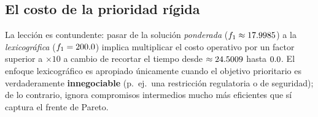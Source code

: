 \subsection{El costo de la prioridad rígida}

La lección es contundente: pasar de la solución \emph{ponderada}
($f_1 \approx \num{17.9985}$) a la \emph{lexicográfica}
($f_1 = \num{200.0}$) implica multiplicar el costo operativo por un
factor superior a $\times 10$ a cambio de recortar el tiempo desde
$\approx \num{24.5009}$ hasta $\num{0.0}$. El enfoque
lexicográfico es apropiado únicamente cuando el objetivo prioritario es
verdaderamente \textbf{innegociable} (p.\ ej.\ una restricción regulatoria o
de seguridad); de lo contrario, ignora compromisos intermedios mucho más
eficientes que sí captura el frente de Pareto.
